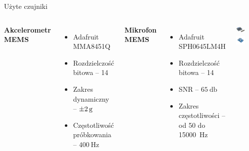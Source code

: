 \documentclass[aspectratio=1610,polish]{beamer} %
\begin{document}
  \begin{frame}{Użyte czujniki}
    \begin{columns}
      \textbf{Akcelerometr MEMS}
      \begin{itemize}
	\item Adafruit MMA8451Q
	\item Rozdzielczość bitowa -- \SI{14}{\bit}
	\item Zakres dynamiczny -- $\SI{\pm 2}{\g}$
	\item Częstotliwość próbkowania -- $\SI{400}{\hertz}$
      \end{itemize}
      \textbf{Mikrofon MEMS}
      \begin{itemize}
	\item Adafruit SPH0645LM4H
	\item Rozdzielczość bitowa -- \SI{14}{\bit}
	\item SNR -- $\SI{65}{\decibel}$
	\item Zakres częstotliwości -- od \num{50} do \SI{15000}{\hertz}
      \end{itemize}
      \centering
      \includegraphics[width=0.5\textwidth,trim={0 3cm 0 3cm},clip]{bitgraphics/MMA8451.jpg}\\
	\includegraphics[width=0.5\textwidth,trim={0 3.9cm 0 4cm},clip]{bitgraphics/mikrofonMEMS.jpg}
    \end{columns}
  \end{frame}
\end{document}
